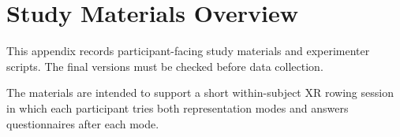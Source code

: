 \section{Study Materials Overview}
\label{app:study_materials_overview}

This appendix records participant-facing study materials and experimenter scripts. The final versions must be checked before data collection.


The materials are intended to support a short within-subject XR rowing session in which each participant tries both representation modes and answers questionnaires after each mode.

